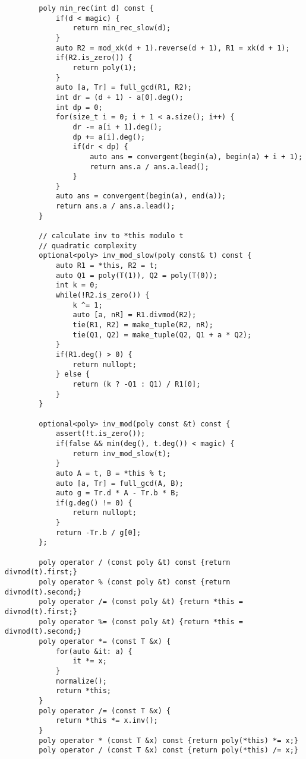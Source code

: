 \begin{lstlisting}
        poly min_rec(int d) const {
            if(d < magic) {
                return min_rec_slow(d);
            }
            auto R2 = mod_xk(d + 1).reverse(d + 1), R1 = xk(d + 1);
            if(R2.is_zero()) {
                return poly(1);
            }
            auto [a, Tr] = full_gcd(R1, R2);
            int dr = (d + 1) - a[0].deg();
            int dp = 0;
            for(size_t i = 0; i + 1 < a.size(); i++) {
                dr -= a[i + 1].deg();
                dp += a[i].deg();
                if(dr < dp) {
                    auto ans = convergent(begin(a), begin(a) + i + 1);
                    return ans.a / ans.a.lead();
                }
            }
            auto ans = convergent(begin(a), end(a));
            return ans.a / ans.a.lead();
        }
        
        // calculate inv to *this modulo t
        // quadratic complexity
        optional<poly> inv_mod_slow(poly const& t) const {
            auto R1 = *this, R2 = t;
            auto Q1 = poly(T(1)), Q2 = poly(T(0));
            int k = 0;
            while(!R2.is_zero()) {
                k ^= 1;
                auto [a, nR] = R1.divmod(R2);
                tie(R1, R2) = make_tuple(R2, nR);
                tie(Q1, Q2) = make_tuple(Q2, Q1 + a * Q2);
            }
            if(R1.deg() > 0) {
                return nullopt;
            } else {
                return (k ? -Q1 : Q1) / R1[0];
            }
        }
        
        optional<poly> inv_mod(poly const &t) const {
            assert(!t.is_zero());
            if(false && min(deg(), t.deg()) < magic) {
                return inv_mod_slow(t);
            }
            auto A = t, B = *this % t;
            auto [a, Tr] = full_gcd(A, B);
            auto g = Tr.d * A - Tr.b * B;
            if(g.deg() != 0) {
                return nullopt;
            }
            return -Tr.b / g[0];
        };
        
        poly operator / (const poly &t) const {return divmod(t).first;}
        poly operator % (const poly &t) const {return divmod(t).second;}
        poly operator /= (const poly &t) {return *this = divmod(t).first;}
        poly operator %= (const poly &t) {return *this = divmod(t).second;}
        poly operator *= (const T &x) {
            for(auto &it: a) {
                it *= x;
            }
            normalize();
            return *this;
        }
        poly operator /= (const T &x) {
            return *this *= x.inv();
        }
        poly operator * (const T &x) const {return poly(*this) *= x;}
        poly operator / (const T &x) const {return poly(*this) /= x;}
        

\end{lstlisting}
